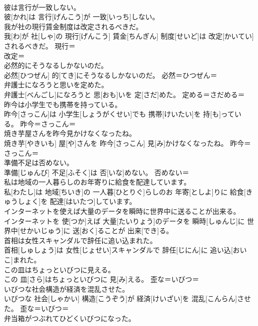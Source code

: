 \documentclass[8pt]{extreport}
\begin{document}
\begin{CJK}{UTF8}{min}
\\	彼は言行が一致しない。	
\\	彼[かれ]は 言行[げんこう]が 一致[いっち]しない。	
\\	我が社の現行賃金制度は改定されるべきだ。	
\\	我[わ]が 社[しゃ]の 現行[げんこう] 賃金[ちんぎん] 制度[せいど]は 改定[かいてい]されるべきだ。	現行＝ 
\\	改定＝ 
\\	必然的にそうなるしかないのだ。	
\\	必然[ひつぜん] 的[てき]にそうなるしかないのだ。	必然＝ひつぜん＝ 
\\	弁護士になろうと思いを定めた。	
\\	弁護士[べんごし]になろうと 思[おも]いを 定[さだ]めた。	定める＝さだめる＝ 
\\	昨今は小学生でも携帯を持っている。	
\\	昨今[さっこん]は 小学生[しょうがくせい]でも 携帯[けいたい]を 持[も]っている。	昨今＝さっこん＝ 
\\	焼き芋屋さんを昨今見かけなくなったね。	
\\	焼き芋[やきいも] 屋[や]さんを 昨今[さっこん] 見[み]かけなくなったね。	昨今＝さっこん＝ 
\\	準備不足は否めない。	
\\	準備[じゅんび] 不足[ふそく]は 否[いな]めない。	否めない＝ 
\\	私は地域の一人暮らしのお年寄りに給食を配達しています。	
\\	私[わたし]は 地域[ちいき]の 一人暮[ひとりぐ]らしのお 年寄[としよ]りに 給食[きゅうしょく]を 配達[はいたつ]しています。	
\\	インターネットを使えば大量のデータを瞬時に世界中に送ることが出来る。	
\\	インターネットを 使[つか]えば 大量[たいりょう]のデータを 瞬時[しゅんじ]に 世界中[せかいじゅう]に 送[おく]ることが 出来[でき]る。	
\\	首相は女性スキャンダルで辞任に追い込まれた。	
\\	首相[しゅしょう]は 女性[じょせい]スキャンダルで 辞任[じにん]に 追い込[おいこ]まれた。	
\\	この皿はちょっといびつに見える。	
\\	この 皿[さら]はちょっといびつに 見[み]える。	歪な＝いびつ＝ 
\\	いびつな社会構造が経済を混乱させた。	
\\	いびつな 社会[しゃかい] 構造[こうぞう]が 経済[けいざい]を 混乱[こんらん]させた。	歪な＝いびつ＝ 
\\	弁当箱がつぶれてひどくいびつになった。	

\end{CJK}
\end{document}
